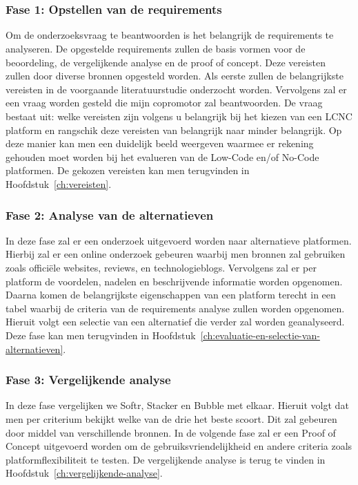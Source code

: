 
\chapter{}%
\label{ch:methodologie}

\subsection*{Fase 1: Opstellen van de requirements}%
\label{sec:opstellen-van-de-requirements}
Om de onderzoeksvraag te beantwoorden is het belangrijk 
de requirements te analyseren. De opgestelde requirements zullen de basis vormen voor de beoordeling, de vergelijkende analyse en de proof of concept.
Deze vereisten zullen door diverse bronnen opgesteld worden. Als eerste
zullen de belangrijkste vereisten in de voorgaande literatuurstudie onderzocht worden. Vervolgens zal er een vraag
worden gesteld die mijn copromotor zal beantwoorden. De vraag bestaat uit: welke vereisten zijn volgens u belangrijk bij het kiezen van een 
LCNC platform en rangschik deze vereisten van belangrijk naar minder belangrijk. Op deze manier kan men een duidelijk beeld weergeven waarmee er rekening gehouden moet worden 
bij het evalueren van de Low-Code en/of No-Code platformen. De gekozen vereisten kan men terugvinden in Hoofdstuk~\ref{ch:vereisten}.

\subsection*{Fase 2: Analyse van de alternatieven}%
\label{sec:analyse-van-de-alternatieven}
In deze fase zal er een onderzoek uitgevoerd worden naar alternatieve platformen.
Hierbij zal er een online onderzoek gebeuren waarbij men bronnen zal gebruiken zoals 
officiële websites, reviews, en technologieblogs. Vervolgens zal er per platform de 
voordelen, nadelen en beschrijvende informatie worden opgenomen. Daarna komen 
de belangrijkste eigenschappen van een platform terecht in een tabel waarbij de criteria
van de requirements analyse zullen worden opgenomen. Hieruit volgt een selectie van een 
alternatief die verder zal worden geanalyseerd. Deze fase kan men terugvinden in Hoofdstuk~\ref{ch:evaluatie-en-selectie-van-alternatieven}.


\subsection*{Fase 3: Vergelijkende analyse}%
\label{sec:vergelijkende-analyse}
In deze fase vergelijken we Softr, Stacker en Bubble met elkaar.
Hieruit volgt dat men per criterium bekijkt welke van de drie het beste scoort. Dit zal gebeuren door middel van verschillende bronnen.
In de volgende fase zal er een Proof of Concept uitgevoerd worden om de gebruiksvriendelijkheid en andere criteria zoals platformflexibiliteit te testen.
De vergelijkende analyse is terug te vinden in Hoofdstuk~\ref{ch:vergelijkende-analyse}.

